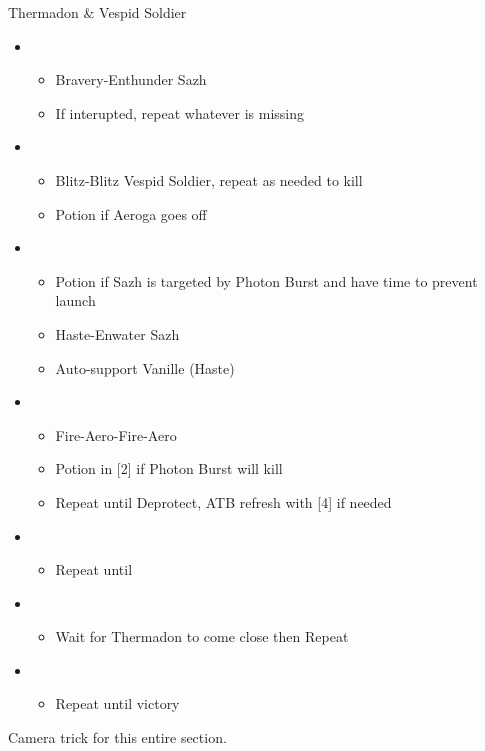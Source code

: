 \documentclass{report}
\begin{document}
\begin{battle}{Thermadon \& Vespid Soldier}
\begin{itemize}
    \item \first
    \begin{itemize}
        \item Bravery-Enthunder Sazh
        \item If interupted, repeat whatever is missing
    \end{itemize}
    \item \sixth
    \begin{itemize}
        \item Blitz-Blitz Vespid Soldier, repeat as needed to kill
        \item Potion if Aeroga goes off
    \end{itemize}
    \item \first
    \begin{itemize}
        \item Potion if Sazh is targeted by Photon Burst and have time to prevent launch
        \item Haste-Enwater Sazh
        \item Auto-support Vanille (Haste)
    \end{itemize}
    \item \fifth
    \begin{itemize}
        \item Fire-Aero-Fire-Aero
        \item Potion in [2] if Photon Burst will kill
        \item Repeat until Deprotect, ATB refresh with [4] if needed
    \end{itemize}
    \item \fourth
    \begin{itemize}
        \item Repeat until \stagger
    \end{itemize}
    \item \second
    \begin{itemize}
        \item Wait for Thermadon to come close then Repeat
    \end{itemize}
    \item \third
    \begin{itemize}
        \item Repeat until victory
    \end{itemize}
\end{itemize}
\end{battle}
Camera trick for this entire section.
\end{document}
